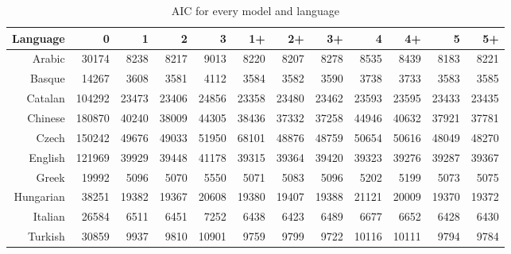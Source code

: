 \documentclass[paper=a4, fontsize=11pt]{scrartcl} %
\begin{document}
\begin{table}
\begin{adjustbox}{center}
\centering
\begin{tabular}{rrrrrrrrrrrr}
 Language & 0 & 1 & 2 & 3 & 1+ & 2+ & 3+ & 4 & 4+ & 5 & 5+ \\
  \midrule
Arabic & 30174 & 8238 & 8217 & 9013 & 8220 & 8207 & 8278 & 8535 & 8439 & 8183 & 8221 \\
  Basque & 14267 & 3608 & 3581 & 4112 & 3584 & 3582 & 3590 & 3738 & 3733 & 3583 & 3585 \\
  Catalan & 104292 & 23473 & 23406 & 24856 & 23358 & 23480 & 23462 & 23593 & 23595 & 23433 & 23435 \\
  Chinese & 180870 & 40240 & 38009 & 44305 & 38436 & 37332 & 37258 & 44946 & 40632 & 37921 & 37781 \\
  Czech & 150242 & 49676 & 49033 & 51950 & 68101 & 48876 & 48759 & 50654 & 50616 & 48049 & 48270 \\
  English & 121969 & 39929 & 39448 & 41178 & 39315 & 39364 & 39420 & 39323 & 39276 & 39287 & 39367 \\
  Greek & 19992 & 5096 & 5070 & 5550 & 5071 & 5083 & 5096 & 5202 & 5199 & 5073 & 5075 \\
  Hungarian & 38251 & 19382 & 19367 & 20608 & 19380 & 19407 & 19388 & 21121 & 20009 & 19370 & 19372 \\
  Italian & 26584 & 6511 & 6451 & 7252 & 6438 & 6423 & 6489 & 6677 & 6652 & 6428 & 6430 \\
  Turkish & 30859 & 9937 & 9810 & 10901 & 9759 & 9799 & 9722 & 10116 & 10111 & 9794 & 9784 \\
   \bottomrule
\end{tabular}
\end{adjustbox}
\caption{AIC for every model and language}
\label{tab:aic}
\end{table}
\end{document}
